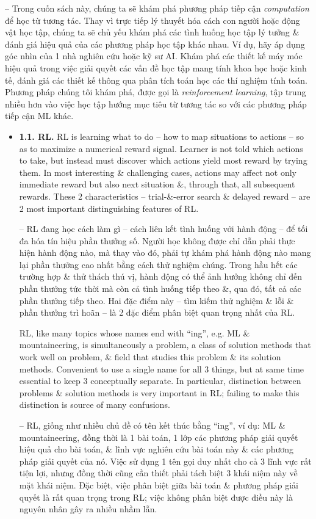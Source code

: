 \documentclass{article}
\begin{document}
\begin{itemize}
    -- Trong cuốn sách này, chúng ta sẽ khám phá phương pháp tiếp cận {\it computation} để học từ tương tác. Thay vì trực tiếp lý thuyết hóa cách con người hoặc động vật học tập, chúng ta sẽ chủ yếu khám phá các tình huống học tập lý tưởng \& đánh giá hiệu quả của các phương pháp học tập khác nhau. Ví dụ, hãy áp dụng góc nhìn của 1 nhà nghiên cứu hoặc kỹ sư AI. Khám phá các thiết kế máy móc hiệu quả trong việc giải quyết các vấn đề học tập mang tính khoa học hoặc kinh tế, đánh giá các thiết kế thông qua phân tích toán học các thí nghiệm tính toán. Phương pháp chúng tôi khám phá, được gọi là {\it reinforcement learning}, tập trung nhiều hơn vào việc học tập hướng mục tiêu từ tương tác so với các phương pháp tiếp cận ML khác.
    \begin{itemize}
        \item {\bf1.1. RL.} RL is learning what to do -- how to map situations to actions -- so as to maximize a numerical reward signal. Learner is not told which actions to take, but instead must discover which actions yield most reward by trying them. In most interesting \& challenging cases, actions may affect not only immediate reward but also next situation \&, through that, all subsequent rewards. These 2 characteristics -- trial-\&-error search \& delayed reward -- are 2 most important distinguishing features of RL.

        -- RL đang học cách làm gì -- cách liên kết tình huống với hành động -- để tối đa hóa tín hiệu phần thưởng số. Người học không được chỉ dẫn phải thực hiện hành động nào, mà thay vào đó, phải tự khám phá hành động nào mang lại phần thưởng cao nhất bằng cách thử nghiệm chúng. Trong hầu hết các trường hợp \& thử thách thú vị, hành động có thể ảnh hưởng không chỉ đến phần thưởng tức thời mà còn cả tình huống tiếp theo \&, qua đó, tất cả các phần thưởng tiếp theo. Hai đặc điểm này -- tìm kiếm thử nghiệm \& lỗi \& phần thưởng trì hoãn -- là 2 đặc điểm phân biệt quan trọng nhất của RL.

        RL, like many topics whose names end with ``ing'', e.g. ML \& mountaineering, is simultaneously a problem, a class of solution methods that work well on problem, \& field that studies this problem \& its solution methods. Convenient to use a single name for all 3 things, but at same time essential to keep 3 conceptually separate. In particular, distinction between problems \& solution methods is very important in RL; failing to make this distinction is source of many confusions.

        -- RL, giống như nhiều chủ đề có tên kết thúc bằng ``ing'', ví dụ: ML \& mountaineering, đồng thời là 1 bài toán, 1 lớp các phương pháp giải quyết hiệu quả cho bài toán, \& lĩnh vực nghiên cứu bài toán này \& các phương pháp giải quyết của nó. Việc sử dụng 1 tên gọi duy nhất cho cả 3 lĩnh vực rất tiện lợi, nhưng đồng thời cũng cần thiết phải tách biệt 3 khái niệm này về mặt khái niệm. Đặc biệt, việc phân biệt giữa bài toán \& phương pháp giải quyết là rất quan trọng trong RL; việc không phân biệt được điều này là nguyên nhân gây ra nhiều nhầm lẫn.


\end{itemize}
\end{itemize}
\end{document}
